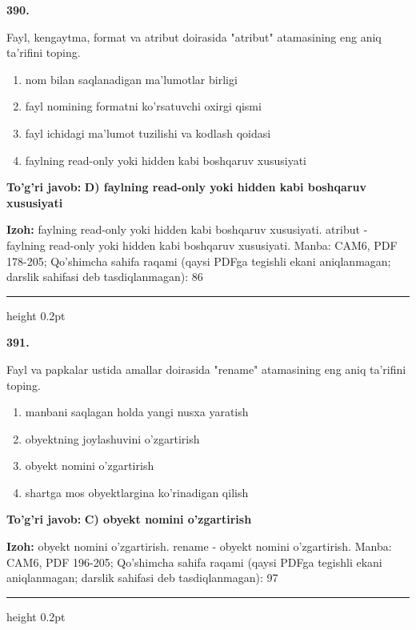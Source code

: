 \documentclass[10pt,a4paper]{article}
\begin{document}
{\bfseries\sffamily\color{ink} 390.}
\par
Fayl, kengaytma, format va atribut doirasida "atribut" atamasining eng aniq ta'rifini toping.
\begin{enumerate}[label=\Alph*),leftmargin=9mm]
\item nom bilan saqlanadigan ma'lumotlar birligi
\item fayl nomining formatni ko'rsatuvchi oxirgi qismi
\item fayl ichidagi ma'lumot tuzilishi va kodlash qoidasi
\item faylning read-only yoki hidden kabi boshqaruv xususiyati
\end{enumerate}
\begin{tcolorbox}[enhanced,breakable,colback=teal!4,colframe=teal!60!black,boxrule=0.45pt,arc=1.2mm,left=2.7mm,right=2.7mm,top=1.8mm,bottom=1.8mm,before skip=2mm,after skip=2mm]
{\bfseries\sffamily\color{teal}To'g'ri javob:} \textbf{D) faylning read-only yoki hidden kabi boshqaruv xususiyati}
\par\smallskip
{\bfseries Izoh:} faylning read-only yoki hidden kabi boshqaruv xususiyati. atribut - faylning read-only yoki hidden kabi boshqaruv xususiyati. Manba: CAM6, PDF 178-205; Qo'shimcha sahifa raqami (qaysi PDFga tegishli ekani aniqlanmagan; darslik sahifasi deb tasdiqlanmagan): 86
\end{tcolorbox}
\vspace{2mm}\hrule height 0.2pt\vspace{3mm}

{\bfseries\sffamily\color{ink} 391.}
\par
Fayl va papkalar ustida amallar doirasida "rename" atamasining eng aniq ta'rifini toping.
\begin{enumerate}[label=\Alph*),leftmargin=9mm]
\item manbani saqlagan holda yangi nusxa yaratish
\item obyektning joylashuvini o'zgartirish
\item obyekt nomini o'zgartirish
\item shartga mos obyektlargina ko'rinadigan qilish
\end{enumerate}
\begin{tcolorbox}[enhanced,breakable,colback=teal!4,colframe=teal!60!black,boxrule=0.45pt,arc=1.2mm,left=2.7mm,right=2.7mm,top=1.8mm,bottom=1.8mm,before skip=2mm,after skip=2mm]
{\bfseries\sffamily\color{teal}To'g'ri javob:} \textbf{C) obyekt nomini o'zgartirish}
\par\smallskip
{\bfseries Izoh:} obyekt nomini o'zgartirish. rename - obyekt nomini o'zgartirish. Manba: CAM6, PDF 196-205; Qo'shimcha sahifa raqami (qaysi PDFga tegishli ekani aniqlanmagan; darslik sahifasi deb tasdiqlanmagan): 97
\end{tcolorbox}
\vspace{2mm}\hrule height 0.2pt\vspace{3mm}
\end{document}
